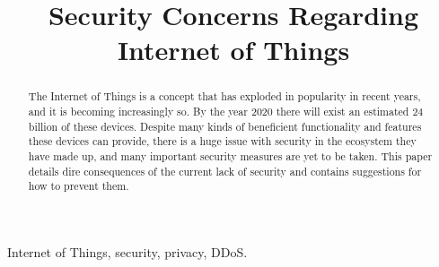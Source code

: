 \documentclass[a4paper, conference]{IEEEtran/IEEEtran}
\begin{document}
%
\title{Security Concerns Regarding Internet of Things}

\author{
}

\maketitle

\begin{abstract}
The Internet of Things is a concept that has exploded in popularity in recent years, and it is becoming increasingly so. By the year 2020 there will exist an estimated 24 billion of these devices.\cite{meola} Despite many kinds of beneficient functionality and features these devices can provide, there is a huge issue with security in the ecosystem they have made up, and many important security measures are yet to be taken. This paper details dire consequences of the current lack of security and contains suggestions for how to prevent them.
\end{abstract}

\begin{IEEEkeywords}
Internet of Things, security, privacy, DDoS.
\end{IEEEkeywords}

%
\IEEEpeerreviewmaketitle
\end{document}

